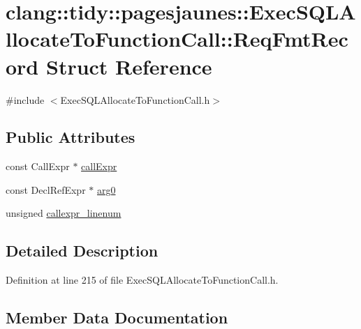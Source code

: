 \hypertarget{structclang_1_1tidy_1_1pagesjaunes_1_1_exec_s_q_l_allocate_to_function_call_1_1_req_fmt_record}{}\section{clang\+:\+:tidy\+:\+:pagesjaunes\+:\+:Exec\+S\+Q\+L\+Allocate\+To\+Function\+Call\+:\+:Req\+Fmt\+Record Struct Reference}
\label{structclang_1_1tidy_1_1pagesjaunes_1_1_exec_s_q_l_allocate_to_function_call_1_1_req_fmt_record}


{\ttfamily \#include $<$Exec\+S\+Q\+L\+Allocate\+To\+Function\+Call.\+h$>$}

\subsection*{Public Attributes}
\begin{DoxyCompactItemize}
\item 
const Call\+Expr $\ast$ \hyperlink{structclang_1_1tidy_1_1pagesjaunes_1_1_exec_s_q_l_allocate_to_function_call_1_1_req_fmt_record_ac22c65bee38c61489937ce1ae7824b1d}{call\+Expr}
\item 
const Decl\+Ref\+Expr $\ast$ \hyperlink{structclang_1_1tidy_1_1pagesjaunes_1_1_exec_s_q_l_allocate_to_function_call_1_1_req_fmt_record_a4282453069559b89f7f44a9b99cdd4e2}{arg0}
\item 
unsigned \hyperlink{structclang_1_1tidy_1_1pagesjaunes_1_1_exec_s_q_l_allocate_to_function_call_1_1_req_fmt_record_af8576f48217e6f56b9f1d0dfdecb91d7}{callexpr\+\_\+linenum}
\end{DoxyCompactItemize}


\subsection{Detailed Description}


Definition at line 215 of file Exec\+S\+Q\+L\+Allocate\+To\+Function\+Call.\+h.



\subsection{Member Data Documentation}
\mbox{\label{structclang_1_1tidy_1_1pagesjaunes_1_1_exec_s_q_l_allocate_to_function_call_1_1_req_fmt_record_a4282453069559b89f7f44a9b99cdd4e2}} 
